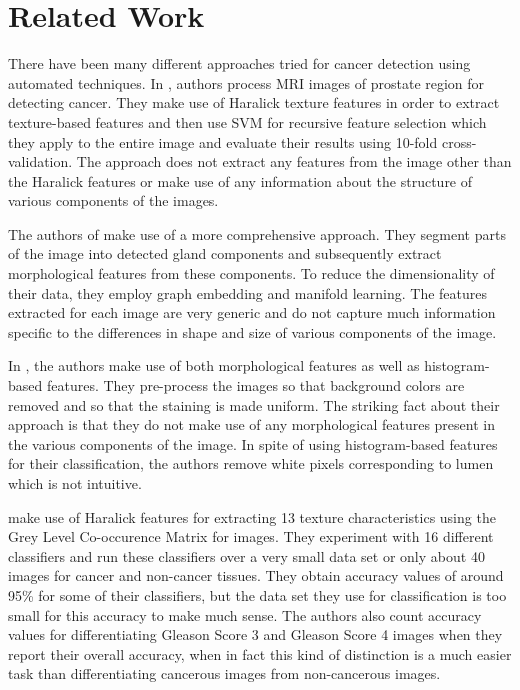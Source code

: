 \section{Related Work}
There have been many different approaches tried for cancer detection using automated techniques. In \cite{automatic}, authors process MRI images of prostate region for detecting cancer. They make use of Haralick texture features \cite{haralick1973textural} in order to extract texture-based features and then use SVM for recursive feature selection which they apply to the entire image and evaluate their results using 10-fold cross-validation. The approach does not extract any features from the image other than the Haralick features or make use of any information about the structure of various components of the images. 

The authors of \cite{naik2007gland} make use of a more comprehensive approach. They segment parts of the image into detected gland components and subsequently extract morphological features from these components. To reduce the dimensionality of their data, they employ graph embedding and manifold learning. The features extracted for each image are very generic and do not capture much information specific to the differences in shape and size of various components of the image.

In \cite{tabesh2007multifeature}, the authors make use of both morphological features as well as histogram-based features. They pre-process the images so that background colors are removed and so that the staining is made uniform. The striking fact about their approach is that they do not make use of any morphological features present in the various components of the image. In spite of using histogram-based features for their classification, the authors remove white pixels corresponding to lumen which is not intuitive. 

\cite{alexandratou2010evaluation} make use of Haralick features for extracting 13 texture characteristics using the Grey Level Co-occurence Matrix for images. They experiment with 16 different classifiers and run these classifiers over a very small data set or only about 40 images for cancer and non-cancer tissues. They obtain accuracy values of around 95\% for some of their classifiers, but the data set they use for classification is too small for this accuracy to make much sense. The authors also count accuracy values for differentiating Gleason Score 3 and Gleason Score 4 images when they report their overall accuracy, when in fact this kind of distinction is a much easier task than differentiating cancerous images from non-cancerous images.

